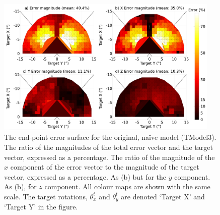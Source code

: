 \documentclass{frontiersSCNS}
\begin{document}
\begin{figure}[!ht]
\begin{center}
\includegraphics[width=0.95\textwidth]{./figures/errorsurface_TModel3.png}
\end{center}
\caption{ The end-point error surface for the original, na\"ive model
(TModel3).  The ratio of the magnitudes of the total error vector
and the target vector, expressed as a percentage.  The ratio of the
magnitude of the $x$ component of the error vector to the magnitude of
the target vector, expressed as a percentage.  As (b) but for the
$y$ component.  As (b), for $z$ component. All colour maps are shown
with the same scale. The target rotations, $\theta_{x}^t$ and
$\theta_{y}^t$ are denoted `Target X' and `Target Y' in the figure.}
\label{fig:errorsurfaceTM3}
\end{figure}
\end{document}

